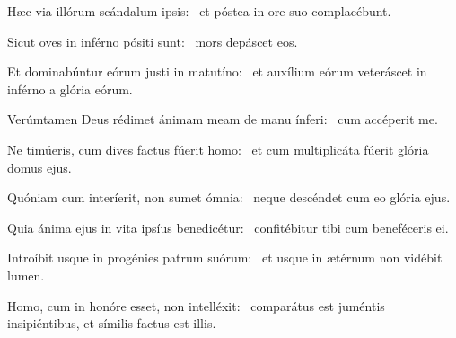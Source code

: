 
\item Hæc via illórum scándalum ipsis:~\psstar{} et póstea in ore suo complacébunt.

\item Sicut oves in inférno pósiti sunt:~\psstar{} mors depáscet eos.

\item Et dominabúntur eórum justi in matutíno:~\psstar{} et auxílium eórum veteráscet in inférno a glória eórum.

\item Verúmtamen Deus rédimet ánimam meam de manu ínferi:~\psstar{} cum accéperit me.

\item Ne timúeris, cum dives factus fúerit homo:~\psstar{} et cum multiplicáta fúerit glória domus ejus.

\item Quóniam cum interíerit, non sumet ómnia:~\psstar{} neque descéndet cum eo glória ejus.

\item Quia ánima ejus in vita ipsíus benedicétur:~\psstar{} confitébitur tibi cum beneféceris ei.

\item Introíbit usque in progénies patrum suórum:~\psstar{} et usque in ætérnum non vidébit lumen.

\item Homo, cum in honóre esset, non intelléxit:~\psstar{} comparátus est juméntis insipiéntibus, et símilis factus est illis.